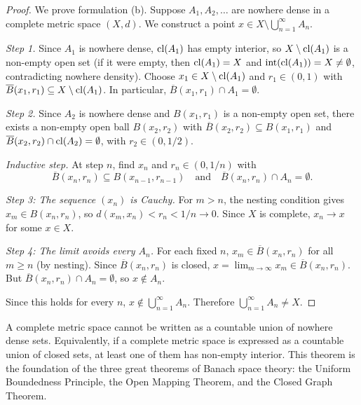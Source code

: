 \documentclass[11pt,a4paper]{article}
\begin{document}
\begin{proof}
We prove formulation (b). Suppose $A_1, A_2, \ldots$ are nowhere dense in
a complete metric space $(X,d)$. We construct a point
$x \in X \setminus \bigcup_{n=1}^\infty A_n$.

\emph{Step 1.} Since $A_1$ is nowhere dense, $\operatorname{cl}(A_1)$ has empty interior,
so $X \setminus \operatorname{cl}(A_1)$ is a non-empty open set (if it were empty, then
$\operatorname{cl}(A_1) = X$ and $\operatorname{int}(\operatorname{cl}(A_1)) = X \ne \emptyset$, contradicting
nowhere density). Choose $x_1 \in X \setminus \operatorname{cl}(A_1)$ and $r_1 \in (0, 1)$
with $\overline{B}(x_1, r_1) \subseteq X \setminus \operatorname{cl}(A_1)$. In particular,
$\overline{B}(x_1, r_1) \cap A_1 = \emptyset$.

\emph{Step 2.} Since $A_2$ is nowhere dense and $B(x_1, r_1)$ is a non-empty
open set, there exists a non-empty open ball $B(x_2, r_2)$ with
$\overline{B}(x_2, r_2) \subseteq B(x_1, r_1)$ and
$\overline{B}(x_2, r_2) \cap \operatorname{cl}(A_2) = \emptyset$, with $r_2 \in (0, 1/2)$.

\emph{Inductive step.} At step $n$, find $x_n$ and $r_n \in (0, 1/n)$ with
\[
\overline{B}(x_n, r_n) \subseteq B(x_{n-1}, r_{n-1})
\quad \text{and} \quad
\overline{B}(x_n, r_n) \cap A_n = \emptyset.
\]

\emph{Step 3: The sequence $(x_n)$ is Cauchy.}
For $m > n$, the nesting condition gives $x_m \in B(x_n, r_n)$, so
$d(x_m, x_n) < r_n < 1/n \to 0$. Since $X$ is complete,
$x_n \to x$ for some $x \in X$.

\emph{Step 4: The limit avoids every $A_n$.}
For each fixed $n$, $x_m \in \overline{B}(x_n, r_n)$ for all $m \ge n$
(by nesting). Since $\overline{B}(x_n, r_n)$ is closed,
$x = \lim_{m \to \infty} x_m \in \overline{B}(x_n, r_n)$. But
$\overline{B}(x_n, r_n) \cap A_n = \emptyset$, so $x \notin A_n$.

Since this holds for every $n$, $x \notin \bigcup_{n=1}^\infty A_n$.
Therefore $\bigcup_{n=1}^\infty A_n \ne X$.
\end{proof}

\begin{keyresult}[title={The Baire Category Theorem}]
A complete metric space cannot be written as a countable union of nowhere
dense sets. Equivalently, if a complete metric space is expressed as a
countable union of closed sets, at least one of them has non-empty interior.
This theorem is the foundation of the three great theorems of Banach space
theory: the Uniform Boundedness Principle, the Open Mapping Theorem, and the
Closed Graph Theorem.
\end{keyresult}
\end{document}
